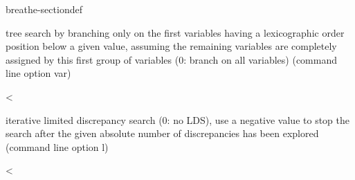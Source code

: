 \documentclass[letterpaper,10pt,openany,oneside,english]{sphinxmanual}
\begin{document}
\begin{fulllineitems}
\begin{sphinxuseclass}{breathe-sectiondef}
\begin{fulllineitems}
\sphinxAtStartPar
tree search by branching only on the first variables having a lexicographic order position below a given value, assuming the remaining variables are completely assigned by this first group of variables (0: branch on all variables) (command line option \sphinxhyphen{}var) 

\end{fulllineitems}


\begin{fulllineitems}
\label{\detokenize{ref/ref_cpp:_CPPv4N8ToulBar27limitedE}}\label{\detokenize{ref/ref_cpp:_CPPv3N8ToulBar27limitedE}}\label{\detokenize{ref/ref_cpp:_CPPv2N8ToulBar27limitedE}}\label{\detokenize{ref/ref_cpp:ToulBar2::limited__b}}
\pysigstartsignatures
\pysigstartmultiline
{}
\pysigstopmultiline
\pysigstopsignatures
\sphinxAtStartPar
\textless{} 

\sphinxAtStartPar
iterative limited discrepancy search (0: no LDS), use a negative value to stop the search after the given absolute number of discrepancies has been explored (command line option \sphinxhyphen{}l) 

\end{fulllineitems}


\begin{fulllineitems}
\label{\detokenize{ref/ref_cpp:_CPPv4N8ToulBar27restartE}}\label{\detokenize{ref/ref_cpp:_CPPv3N8ToulBar27restartE}}\label{\detokenize{ref/ref_cpp:_CPPv2N8ToulBar27restartE}}\label{\detokenize{ref/ref_cpp:ToulBar2::restart__Long}}
\pysigstartsignatures
\pysigstartmultiline
{}
\pysigstopmultiline
\pysigstopsignatures
\sphinxAtStartPar
\textless{} 

\end{fulllineitems}


\end{sphinxuseclass}
\end{fulllineitems}
\end{document}

